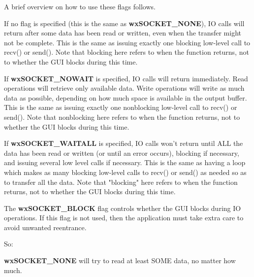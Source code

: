 %
%

\label{wxsocketbasesetflags}


\twocolwidtha{7cm}
\begin{twocollist}\itemsep=0pt
\end{twocollist}

A brief overview on how to use these flags follows.

If no flag is specified (this is the same as {\bf wxSOCKET\_NONE}),
IO calls will return after some data has been read or written, even
when the transfer might not be complete. This is the same as issuing
exactly one blocking low-level call to recv() or send(). Note that
blocking here refers to when the function returns, not to whether
the GUI blocks during this time.

If {\bf wxSOCKET\_NOWAIT} is specified, IO calls will return immediately.
Read operations will retrieve only available data. Write operations will
write as much data as possible, depending on how much space is available
in the output buffer. This is the same as issuing exactly one nonblocking
low-level call to recv() or send(). Note that nonblocking here refers to
when the function returns, not to whether the GUI blocks during this time.

If {\bf wxSOCKET\_WAITALL} is specified, IO calls won't return until ALL
the data has been read or written (or until an error occurs), blocking if
necessary, and issuing several low level calls if necessary. This is the
same as having a loop which makes as many blocking low-level calls to
recv() or send() as needed so as to transfer all the data. Note that
"blocking" here refers to when the function returns, not to whether
the GUI blocks during this time.

The {\bf wxSOCKET\_BLOCK} flag controls whether the GUI blocks during
IO operations. If this flag is not used, then the application must take
extra care to avoid unwanted reentrance. 

So:

{\bf wxSOCKET\_NONE} will try to read at least SOME data, no matter how much.

